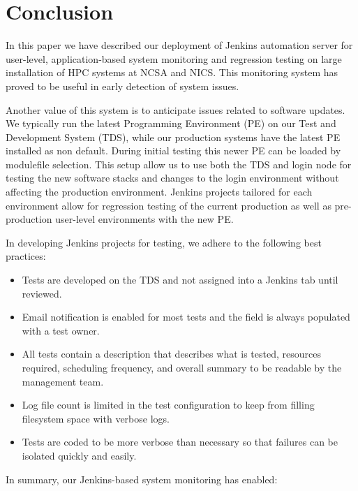 \documentclass[10pt, conference, compsocconf]{IEEEtran}
\begin{document}
\section{Conclusion}
\label{sec:Conclusion}

In this paper we have described our deployment of Jenkins automation server for user-level, application-based system monitoring and regression testing on large installation of HPC systems at NCSA and NICS. 
This monitoring system has proved to be useful in early detection of system issues. 

Another value of this system is to anticipate issues related to software updates. 
We typically run the latest Programming Environment (PE) on our Test and Development System (TDS), while our production systems have the latest PE installed as non default. 
During initial testing this newer PE can be loaded by modulefile selection. This setup allow us to use both the TDS and login node for testing the new software stacks and changes to the login environment without affecting the production environment. 
Jenkins projects tailored for each environment allow for regression testing of the current production as well as pre-production user-level environments with the new PE.

In developing Jenkins projects for testing, we adhere to the following best practices: 
\begin{itemize}
\item Tests are developed on the TDS and not assigned into a Jenkins tab until reviewed. 
\item Email notification is enabled for most tests and the field is always populated with a test owner.
\item All tests contain a description that describes what is tested, resources required, scheduling frequency, and overall summary  to be readable by the management team.
\item Log file count is limited in the test configuration to keep from filling filesystem space with verbose logs.
\item Tests are coded to be more verbose than necessary so that failures can be isolated quickly and easily.
\end{itemize}

In summary, our Jenkins-based system monitoring has enabled: 
\end{document}
